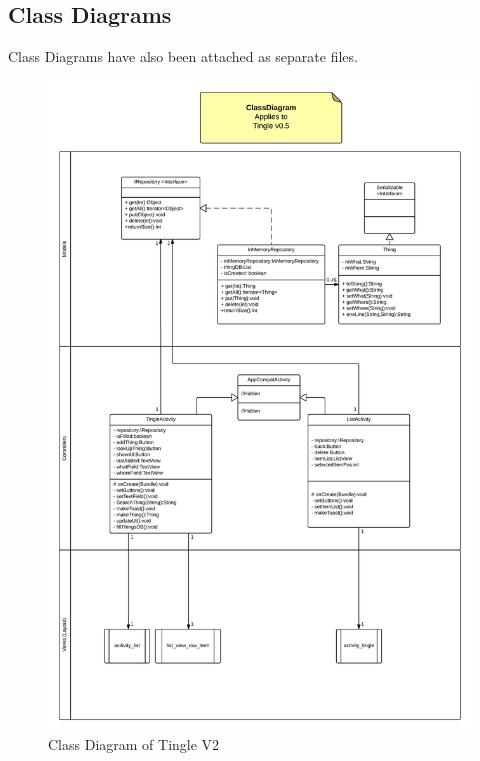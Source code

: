 \documentclass{article}
\begin{document}
\subsection{Class Diagrams}
Class Diagrams have also been attached as separate files.
\begin{figure}[h!]
	\centering
	\includegraphics[scale=0.4]{"TingleApp_ClassDiagram V05"}
	\caption{Class Diagram of Tingle V2}
	\label{fig:TingleApp_ClassDiagramV02}
\end{figure}
\end{document}
